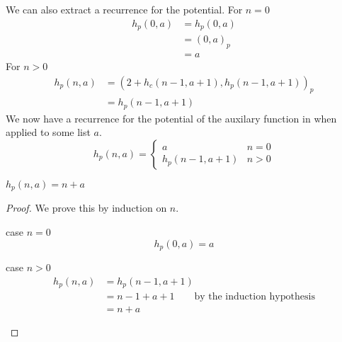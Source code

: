 We can also extract a recurrence for the potential.
For $n=0$
%
\begin{align*}
h_p(0,a) &= h_p(0,a) \\
         &= (0, a)_p \\
         &= a
\end{align*}
%
For $n>0$
%
\begin{align*}
  h_p(n,a) &= (2 + h_c(n-1,a+1), h_p(n-1,a+1))_p \\
           &= h_p(n-1,a+1)
\end{align*}
%
We now have a recurrence for the potential of the auxilary function in
 when applied to some list $a$.
%
\begin{equation}
  h_p(n,a) = \begin{cases}
    a & n = 0 \\
    h_p(n-1,a+1) & n > 0
  \end{cases}
\end{equation}
%
\begin{theorem}
  \label{lem:fr_interp_h_potential}
  $h_p(n,a) = n + a$
\end{theorem}
%
\begin{proof}
  We prove this by induction on $n$.
  \begin{description}
    \item{case $n=0$}\hfill \\
      \[ h_p(0,a) = a \]
    \item{case $n>0$}\hfill \\
      \begin{align*}
      h_p(n,a) &= h_p(n-1,a+1) \\
               &= n - 1 + a + 1  \qquad \text{by the induction hypothesis} \\
               &= n + a
      \end{align*}
  \end{description}
\end{proof}  
%



